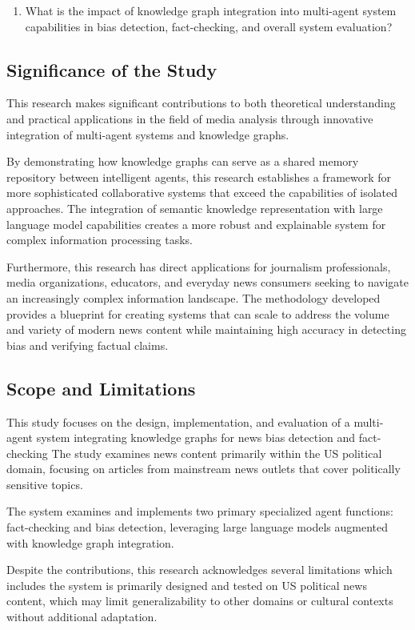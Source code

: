 \documentclass{scrartcl}
\begin{document}
\begin{enumerate}
    \item What is the impact of knowledge graph integration into multi-agent system capabilities in bias detection, fact-checking, and overall system evaluation?
\end{enumerate}

\subsection{Significance of the Study}
This research makes significant contributions to both theoretical understanding and practical applications in the field of media analysis through innovative integration of multi-agent systems and knowledge graphs.

By demonstrating how knowledge graphs can serve as a shared memory repository between intelligent agents, this research establishes a framework for more sophisticated collaborative systems that exceed the capabilities of isolated approaches. The integration of semantic knowledge representation with large language model capabilities creates a more robust and explainable system for complex information processing tasks.

Furthermore, this research has direct applications for journalism professionals, media organizations, educators, and everyday news consumers seeking to navigate an increasingly complex information landscape. The methodology developed provides a blueprint for creating systems that can scale to address the volume and variety of modern news content while maintaining high accuracy in detecting bias and verifying factual claims.

\subsection{Scope and Limitations}
This study focuses on the design, implementation, and evaluation of a multi-agent system integrating knowledge graphs for news bias detection and fact-checking The study examines news content primarily within the US political domain, focusing on articles from mainstream news outlets that cover politically sensitive topics.

The system examines and implements two primary specialized agent functions: fact-checking and bias detection, leveraging large language models augmented with knowledge graph integration.

Despite the contributions, this research acknowledges several limitations which includes the system is primarily designed and tested on US political news content, which may limit generalizability to other domains or cultural contexts without additional adaptation.
\end{document}
